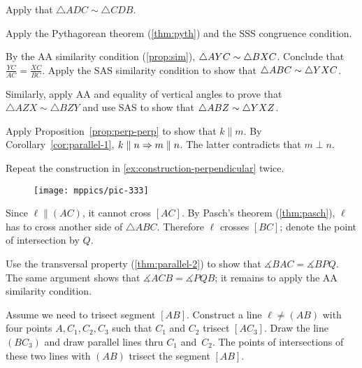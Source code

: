 Apply that $\triangle ADC\sim \triangle CDB$.

Apply the Pythagorean theorem (\ref{thm:pyth}) and the SSS congruence condition.

By the AA similarity condition (\ref{prop:sim}), $\triangle AYC\z\sim \triangle BXC$.
Conclude that 
$\frac{YC}{AC}=\frac{XC}{BC}$.
Apply the SAS similarity condition to show that $\triangle ABC\z\sim \triangle YXC$.

Similarly, apply AA and equality of vertical angles to prove that $\triangle AZX\sim \triangle BZY$ and use SAS to show that $\triangle ABZ\z\sim \triangle YXZ$.

\setcounter{eqtn}{0}


Apply Proposition~\ref{prop:perp-perp} to show that $k\parallel m$.
By Corollary~\ref{cor:parallel-1}, $k\parallel n\z\Rightarrow m\parallel n$.
The latter contradicts that $m\perp n$.

Repeat the construction in \ref{ex:construction-perpendicular} twice.

{

\begin{wrapfigure}{r}{23mm}
\vskip-8mm
\centering
\texttt{[image: mppics/pic-333]}
\end{wrapfigure} 

Since  $\ell\parallel (AC)$, it cannot cross $[AC]$.
By Pasch's theorem (\ref{thm:pasch}), $\ell$ has to cross another side of $\triangle ABC$.
Therefore $\ell$ crosses $[BC]$; denote the point of intersection by $Q$.

Use the transversal property (\ref{thm:parallel-2}) to show that $\measuredangle BAC= \measuredangle BPQ$.
The same argument shows that $\measuredangle ACB= \measuredangle PQB$; it remains to apply the AA similarity condition.

}

Assume we need to trisect segment $[AB]$.
Construct a line $\ell\ne (AB)$ with four points $A,C_1,C_2, C_3$
such that $C_1$ and $C_2$ trisect $[AC_3]$.
Draw the line $(BC_3)$
and draw parallel lines thru $C_1$ and~$C_2$.
The points of intersections of these two lines with $(AB)$ trisect the segment $[AB]$.


